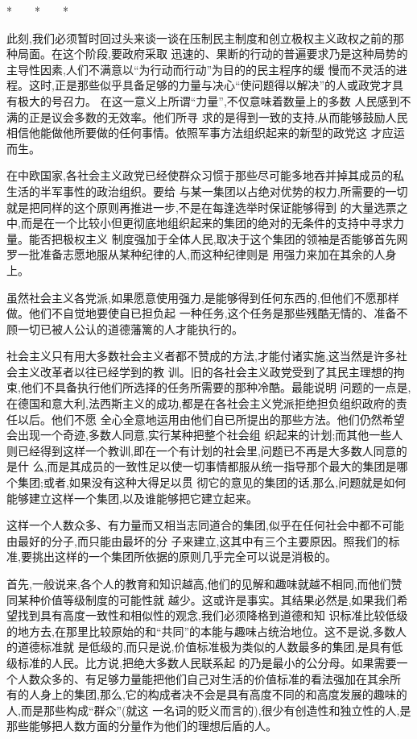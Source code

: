 ﻿\documentclass[12pt]{article}
\begin{document}
*　　*　　*

此刻,我们必须暂时回过头来谈一谈在压制民主制度和创立极权主义政权之前的那种局面。在这个阶段,要政府采取
迅速的、果断的行动的普遍要求乃是这种局势的主导性因素,人们不满意以``为行动而行动''为目的的民主程序的缓
慢而不灵活的进程。这时,正是那些似乎具备足够的力量与决心``使问题得以解决''的人或政党才具有极大的号召力。
在这一意义上所谓``力量'',不仅意味着数量上的多数 \myrule 人民感到不满的正是议会多数的无效率。他们所寻
求的是得到一致的支持,从而能够鼓励人民相信他能做他所要做的任何事情。依照军事方法组织起来的新型的政党这
才应运而生。

在中欧国家,各社会主义政党已经使群众习惯于那些尽可能多地吞并掉其成员的私生活的半军事性的政治组织。要给
与某一集团以占绝对优势的权力,所需要的一切就是把同样的这个原则再推进一步,不是在每逢选举时保证能够得到
的大量选票之中,而是在一个比较小但更彻底地组织起来的集团的绝对的无条件的支持中寻求力量。能否把极权主义
制度强加于全体人民,取决于这个集团的领袖是否能够首先网罗一批准备志愿地服从某种纪律的人,而这种纪律则是
用强力来加在其余的人身上。

虽然社会主义各党派,如果愿意使用强力,是能够得到任何东西的,但他们不愿那样做。他们不自觉地要使自已担负起
一种任务,这个任务是那些残酷无情的、准备不顾一切已被人公认的道德藩篱的人才能执行的。

社会主义只有用大多数社会主义者都不赞成的方法,才能付诸实施,这当然是许多社会主义改革者以往已经学到的教
训。旧的各社会主义政党受到了其民主理想的拘束,他们不具备执行他们所选择的任务所需要的那种冷酷。最能说明
问题的一点是,在德国和意大利,法西斯主义的成功,都是在各社会主义党派拒绝担负组织政府的责任以后。他们不愿
全心全意地运用由他们自已所提出的那些方法。他们仍然希望会出现一个奇迹,多数人同意,实行某种把整个社会组
织起来的计划;而其他一些人则已经得到这样一个教训,即在一个有计划的社会里,问题已不再是大多数人同意的是什
么,而是其成员的一致性足以使一切事情都服从统一指导那个最大的集团是哪个集团;或者,如果没有这种大得足以贯
彻它的意见的集团的话,那么,问题就是如何能够建立这样一个集团,以及谁能够把它建立起来。

这样一个人数众多、有力量而又相当志同道合的集团,似乎在任何社会中都不可能由最好的分子,而只能由最坏的分
子来建立,这其中有三个主要原因。照我们的标准,要挑出这样的一个集团所依据的原则几乎完全可以说是消极的。

首先,一般说来,各个人的教育和知识越高,他们的见解和趣味就越不相同,而他们赞同某种价值等级制度的可能性就
越少。这或许是事实。其结果必然是,如果我们希望找到具有高度一致性和相似性的观念,我们必须降格到道德和知
识标准比较低级的地方去,在那里比较原始的和``共同''的本能与趣味占统治地位。这不是说,多数人的道德标准就
是低级的,而只是说,价值标准极为类似的人数最多的集团,是具有低级标准的人民。比方说,把绝大多数人民联系起
的乃是最小的公分母。如果需要一个人数众多的、有足够力量能把他们自己对生活的价值标准的看法强加在其余所
有的人身上的集团,那么,它的构成者决不会是具有高度不同的和高度发展的趣味的人,而是那些构成``群众''(就这
一名词的贬义而言的),很少有创造性和独立性的人,是那些能够把人数方面的分量作为他们的理想后盾的人。
\end{document}
